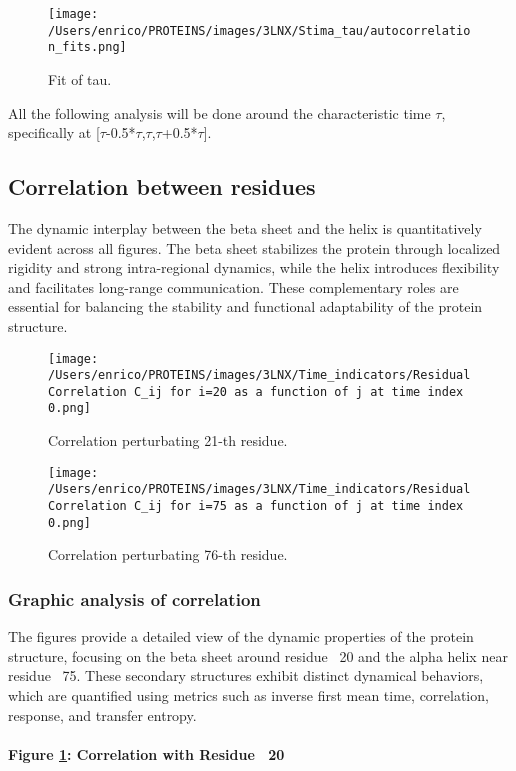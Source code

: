 \documentclass[English, Lau, oneside]{sapthesis}
\begin{document}
\begin{figure}[h!]
    \centering
    \texttt{[image: /Users/enrico/PROTEINS/images/3LNX/Stima\_tau/autocorrelation\_fits.png]}
    \caption{Fit of tau.}
\end{figure}
All the following analysis will be done around the characteristic time \(\tau\), specifically at [\(\tau\)-0.5*\(\tau\),\(\tau\),\(\tau\)+0.5*\(\tau\)].

\newpage



\subsection*{Correlation between residues}
\noindent The dynamic interplay between the beta sheet and the helix is quantitatively evident across all figures. The beta sheet stabilizes the protein through localized rigidity and strong intra-regional dynamics, while the helix introduces flexibility and facilitates long-range communication. These complementary roles are essential for balancing the stability and functional adaptability of the protein structure.

\begin{figure}[h!]
    \centering
    \texttt{[image: /Users/enrico/PROTEINS/images/3LNX/Time\_indicators/Residual Correlation C\_ij for i=20 as a function of j at time index 0.png]}
    \caption{Correlation perturbating 21-th residue.}
    \label{fig:corr21}
\end{figure}

\begin{figure}[h!]
    \centering
    \texttt{[image: /Users/enrico/PROTEINS/images/3LNX/Time\_indicators/Residual Correlation C\_ij for i=75 as a function of j at time index 0.png]}
    \caption{Correlation perturbating 76-th residue.}
    \label{fig:corr76}
\end{figure}
\subsubsection*{Graphic analysis of correlation}
The figures provide a detailed view of the dynamic properties of the protein structure, focusing on the beta sheet around residue ~20 and the alpha helix near residue ~75. These secondary structures exhibit distinct dynamical behaviors, which are quantified using metrics such as inverse first mean time, correlation, response, and transfer entropy.
\paragraph{Figure \ref{fig:corr21}: Correlation with Residue ~20}
\end{document}
